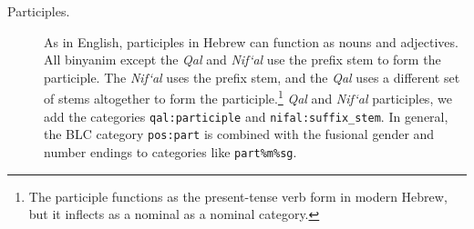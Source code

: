 \begin{description}



\item[Participles.]
As in English, participles in Hebrew can function as nouns and adjectives.
All binyanim except the \textit{Qal} and \textit{Nif`al} use the prefix stem to form the participle. The \textit{Nif`al} uses the prefix stem, and the \textit{Qal} uses a different set of stems altogether to form the participle.\footnote{The participle functions as the present-tense verb form in modern Hebrew, but it inflects as a nominal as a nominal category.}
\textit{Qal} and \textit{Nif`al} participles, we add the categories \texttt{qal:participle} and \texttt{nifal:suffix\_stem}.  In general, the BLC category \texttt{pos:part} is combined with the fusional gender and number endings to categories like \texttt{part\%m\%sg}.


\end{description}
